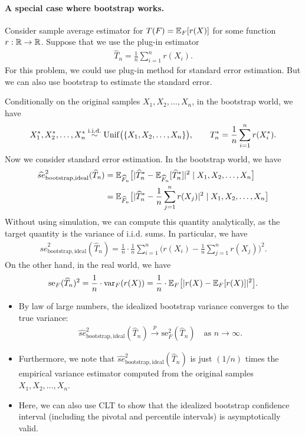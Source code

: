 \documentclass[11pt,letterpaper]{article}
\numberwithin{assumption}{lecture}
\numberwithin{theorem}{lecture}
\numberwithin{proposition}{lecture}
\numberwithin{lemma}{lecture}
\numberwithin{claim}{lecture}
\numberwithin{corollary}{lecture}
\numberwithin{definition}{lecture}
\numberwithin{conjecture}{lecture}
\numberwithin{remark}{lecture}
\numberwithin{example}{lecture}
\numberwithin{equation}{lecture}
\begin{document}
\paragraph{A special case where bootstrap works.}
Consider sample average estimator for $T (F) = {\mathbb{E}}_F [r (X)]$ for some function $r: \mathbb{R} \to \mathbb{R}$. Suppose that we use the plug-in estimator
\begin{align*}
  \widehat{T}_n = \frac{1}{n} \sum_{i=1}^n r(X_i).
\end{align*}
For this problem, we could use plug-in method for standard error estimation. But we can also use bootstrap to estimate the standard error.

Conditionally on the original samples $X_1, X_2, \ldots, X_n$, in the bootstrap world, we have
\begin{align*}
  X_1^*, X_2^*, \ldots, X_n^* \overset{\mathrm{i.i.d.}}{\sim} \mathrm{Unif} \big(\{X_1, X_2, \ldots, X_n\}\big), \qquad T_n^* = \frac{1}{n} \sum_{i=1}^n r(X_i^*).
\end{align*}
Now we consider standard error estimation. In the bootstrap world, we have
\begin{align*}
  \widehat{se}_{\mathrm{bootstrap, ideal}}^2 (\widehat{T}_n) &= {\mathbb{E}}_{\widehat{F}_n} \big[ | \widehat{T}_n^* - {\mathbb{E}}_{\widehat{F}_n} [\widehat{T}_n^*] |^2 \mid X_1, X_2, \ldots, X_n \big]\\
  &= {\mathbb{E}}_{\widehat{F}_n} \big[ | \widehat{T}_n^* - \frac{1}{n} \sum_{j=1}^n r(X_j) |^2 \mid X_1, X_2, \ldots, X_n \big]
\end{align*}
Without using simulation, we can compute this quantity analytically, as the target quantity is the variance of $\mathrm{i.i.d.}$ sums. In particular, we have
\begin{align*}
  \widehat{se}_{\mathrm{bootstrap, ideal}}^2 (\widehat{T}_n) = \frac{1}{n} \cdot \frac{1}{n} \sum_{i=1}^n \big(r(X_i) - \frac{1}{n} \sum_{j=1}^n r(X_j)\big)^2.
\end{align*}
On the other hand, in the real world, we have
\begin{align*}
    \mathrm{se}_F (\widehat{T}_n)^2 = \frac{1}{n} \cdot \operatorname{var}_F (r(X)) = \frac{1}{n} \cdot {\mathbb{E}}_F \big[ | r(X) - {\mathbb{E}}_F [r(X)] |^2 \big].
\end{align*}
\begin{itemize}
  \item
By law of large numbers, the idealized bootstrap variance converges to the true variance:
  \begin{align*}
    \widehat{se}_{\mathrm{bootstrap, ideal}}^2 (\widehat{T}_n) \xrightarrow{p} \mathrm{se}_F^2 (\widehat{T}_n) \quad \text{as } n \to \infty.
  \end{align*}
  \item Furthermore, we note that $ \widehat{se}_{\mathrm{bootstrap, ideal}}^2 (\widehat{T}_n) $ is just $(1/n)$ times the empirical variance estimator computed from the original samples $X_1, X_2, \ldots, X_n$.
  \item Here, we can also use CLT to show that the idealized bootstrap confidence interval (including the pivotal and percentile intervals) is asymptotically valid.
\end{itemize}
\end{document}
